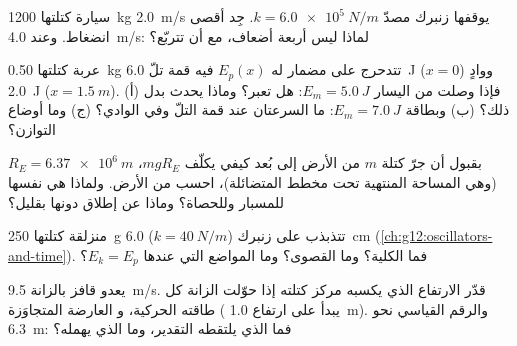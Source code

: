 \begin{exercise}[$\star\star$]\label{exo:g12:work-and-energy:11}
سيارة كتلتها \qty{1200}{kg}  \qty{2.0}{m/s} يوقفها زنبرك مصدّ
 $k = \qty{6.0e5}{N/m}$. جِد أقصى انضغاط.
وعند \qty{4.0}{m/s}: لماذا ليس أربعة أضعاف، مع أن  تتربّع؟
\end{exercise}

\begin{exercise}[$\star\star\star$]\label{exo:g12:work-and-energy:12}
عربة كتلتها \qty{0.50}{kg} تتدحرج على مضمار له $E_p(x)$ فيه
قمة تلّ \qty{6.0}{J} ($x = 0$) ووادٍ \qty{2.0}{J}
($x = \qty{1.5}{m}$). (أ) فإذا وصلت من اليسار 
$E_m = \qty{5.0}{J}$: هل تعبر؟ وماذا يحدث بدل ذلك؟ (ب) وبطاقة
$E_m = \qty{7.0}{J}$: ما السرعتان عند قمة التلّ وفي الوادي؟ (ج) وما أوضاع التوازن؟
\end{exercise}

\begin{exercise}[$\star\star\star$]\label{exo:g12:work-and-energy:13}
بقبول أن جرّ كتلة $m$ من الأرض إلى بُعد كيفي
يكلّف $mgR_E$، $R_E = \qty{6.37e6}{m}$ (وهي المساحة المنتهية تحت مخطط
 المتضائلة)، احسب \emph{} من الأرض.
ولماذا هي نفسها للمسبار وللحصاة؟ وماذا عن إطلاق دونها بقليل؟
\end{exercise}

\begin{exercise}[$\star\star\star$]\label{exo:g12:work-and-energy:14}
منزلقة كتلتها \qty{250}{g} تتذبذب على زنبرك ($k = \qty{40}{N/m}$)
 \qty{6.0}{cm} (\cref{ch:g12:oscillators-and-time}).
فما  الكلية؟ وما  القصوى؟ وما المواضع التي عندها $E_k = E_p$؟
\end{exercise}

\begin{exercise}[$\star\star\star$]\label{exo:g12:work-and-energy:15}
يعدو قافز بالزانة  \qty{9.5}{m/s}. قدّر الارتفاع الذي يكسبه
مركز كتلته إذا حوّلت الزانة كل طاقته الحركية، و
العارضة المتجاوَزة ( يبدأ على ارتفاع \qty{1.0}{m}). والرقم القياسي
نحو \qty{6.3}{m}: فما الذي يلتقطه التقدير، وما الذي يهمله؟
\end{exercise}

